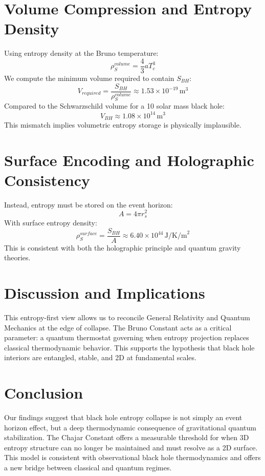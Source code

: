 \documentclass[12pt]{article}
\begin{document}
\section{Volume Compression and Entropy Density}
Using entropy density at the Bruno temperature:
\begin{equation}
\rho_S^{volume} = \frac{4}{3} a T_c^3
\end{equation}
We compute the minimum volume required to contain $S_{BH}$:
\begin{equation}
V_{required} = \frac{S_{BH}}{\rho_S^{volume}} \approx 1.53 \times 10^{-19} \, \text{m}^3
\end{equation}
Compared to the Schwarzschild volume for a 10 solar mass black hole:
\begin{equation}
V_{BH} \approx 1.08 \times 10^{14} \, \text{m}^3
\end{equation}
This mismatch implies volumetric entropy storage is physically implausible.
\section{Surface Encoding and Holographic Consistency}
Instead, entropy must be stored on the event horizon:
\begin{equation}
A = 4\pi r_s^2
\end{equation}
With surface entropy density:
\begin{equation}
\rho_S^{surface} = \frac{S_{BH}}{A} \approx 6.40 \times 10^{44} \, \text{J/K/m}^2
\end{equation}
This is consistent with both the holographic principle and quantum gravity theories.
\section{Discussion and Implications}
This entropy-first view allows us to reconcile General Relativity and Quantum Mechanics at the edge of collapse. The Bruno Constant acts as a critical parameter: a quantum thermostat governing when entropy projection replaces classical thermodynamic behavior. This supports the hypothesis that black hole interiors are entangled, stable, and 2D at fundamental scales.
\section{Conclusion}
Our findings suggest that black hole entropy collapse is not simply an event horizon effect, but a deep thermodynamic consequence of gravitational quantum stabilization. The Chajar Constant offers a measurable threshold for when 3D entropy structure can no longer be maintained and must resolve as a 2D surface. This model is consistent with observational black hole thermodynamics and offers a new bridge between classical and quantum regimes.
\end{document}
